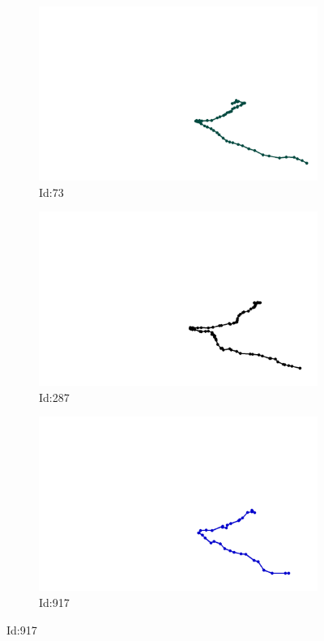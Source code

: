 \documentclass[12pt,twoside]{report}
\begin{document}
\begin{figure}
\centering
\begin{subfigure}[b]{0.20\textwidth}
\centering
\includegraphics[width=\textwidth]{../../trajectories/73.png}
\caption{Id:73}
\end{subfigure}
\begin{subfigure}[b]{0.20\textwidth}
\centering
\includegraphics[width=\textwidth]{../../trajectories/287.png}
\caption{Id:287}
\end{subfigure}
\begin{subfigure}[b]{0.20\textwidth}
\centering
\includegraphics[width=\textwidth]{../../trajectories/917.png}
\caption{Id:917}
\end{subfigure}
\end{figure}
\end{document}
